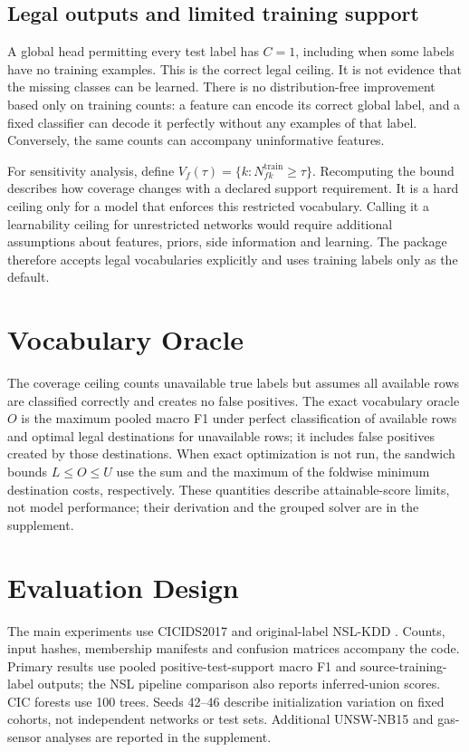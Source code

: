 \documentclass[journal]{IEEEtran}
\begin{document}
\subsection{Legal outputs and limited training support}
A global head permitting every test label has \(C=1\), including when some labels have no training examples. This is the correct legal ceiling. It is not evidence that the missing classes can be learned. There is no distribution-free improvement based only on training counts: a feature can encode its correct global label, and a fixed classifier can decode it perfectly without any examples of that label. Conversely, the same counts can accompany uninformative features.

For sensitivity analysis, define \(V_f(\tau)=\{k:N^{\mathrm{train}}_{fk}\ge\tau\}\). Recomputing the bound describes how coverage changes with a declared support requirement. It is a hard ceiling only for a model that enforces this restricted vocabulary. Calling it a learnability ceiling for unrestricted networks would require additional assumptions about features, priors, side information and learning. The package therefore accepts legal vocabularies explicitly and uses training labels only as the default.

\section{Vocabulary Oracle}
The coverage ceiling counts unavailable true labels but assumes all available rows are classified correctly and creates no false positives. The exact vocabulary oracle \(O\) is the maximum pooled macro F1 under perfect classification of available rows and optimal legal destinations for unavailable rows; it includes false positives created by those destinations. When exact optimization is not run, the sandwich bounds \(L\le O\le U\) use the sum and the maximum of the foldwise minimum destination costs, respectively. These quantities describe attainable-score limits, not model performance; their derivation and the grouped solver are in the supplement.

\section{Evaluation Design}
The main experiments use CICIDS2017 \cite{sharafaldin2018} and original-label NSL-KDD \cite{tavallaee2009}. Counts, input hashes, membership manifests and confusion matrices accompany the code. Primary results use pooled positive-test-support macro F1 and source-training-label outputs; the NSL pipeline comparison also reports inferred-union scores. CIC forests use 100 trees. Seeds 42--46 describe initialization variation on fixed cohorts, not independent networks or test sets. Additional UNSW-NB15 and gas-sensor analyses are reported in the supplement.
\end{document}
